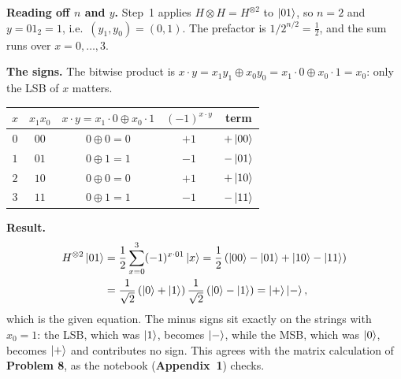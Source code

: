 \documentclass[a4paper, 10pt]{article}
\begin{document}
\begin{solution}
	\noindent \textbf{Reading off \( n \) and \( y \).} Step~1 applies \( H \otimes H = H^{\otimes 2} \) to \( \ket{01} \), so \( n = 2 \) and \( y = 01_2 = 1 \), i.e.\ \( (y_1, y_0) = (0, 1) \). The prefactor is \( 1/2^{n/2} = \tfrac{1}{2} \), and the sum runs over \( x = 0, \dots, 3 \).

	\noindent \textbf{The signs.} The bitwise product is \( x \cdot y = x_1 y_1 \oplus x_0 y_0 = x_1 \cdot 0 \oplus x_0 \cdot 1 = x_0 \): only the LSB of \( x \) matters.
	\begin{center}
		\begin{tabular}{ccccc}
			\toprule
			\( x \) & \( x_1 x_0 \) & \( x \cdot y = x_1 \cdot 0 \oplus x_0 \cdot 1 \) & \( (-1)^{x \cdot y} \) & term            \\
			\midrule
			\( 0 \) & \( 00 \)      & \( 0 \oplus 0 = 0 \)                             & \( +1 \)               & \( +\ket{00} \) \\
			\( 1 \) & \( 01 \)      & \( 0 \oplus 1 = 1 \)                             & \( -1 \)               & \( -\ket{01} \) \\
			\( 2 \) & \( 10 \)      & \( 0 \oplus 0 = 0 \)                             & \( +1 \)               & \( +\ket{10} \) \\
			\( 3 \) & \( 11 \)      & \( 0 \oplus 1 = 1 \)                             & \( -1 \)               & \( -\ket{11} \) \\
			\bottomrule
		\end{tabular}
	\end{center}

	\noindent \textbf{Result.}
	\begin{align*}
		H^{\otimes 2}\ket{01}
		 & = \frac{1}{2}\sum_{x = 0}^{3} (-1)^{x \cdot 01}\ket{x}
		= \frac{1}{2}\left(\ket{00} - \ket{01} + \ket{10} - \ket{11}\right)                               \\
		 & = \frac{1}{\sqrt{2}}\left(\ket{0} + \ket{1}\right) \frac{1}{\sqrt{2}}\left(\ket{0} - \ket{1}\right)
		= \ket{+}\ket{-},
	\end{align*}
	which is the given equation. The minus signs sit exactly on the strings with \( x_0 = 1 \): the LSB, which was \( \ket{1} \), becomes \( \ket{-} \), while the MSB, which was \( \ket{0} \), becomes \( \ket{+} \) and contributes no sign. This agrees with the matrix calculation of \textbf{Problem 8}, as the notebook (\textbf{Appendix~1}) checks.
\end{solution}
\end{document}
